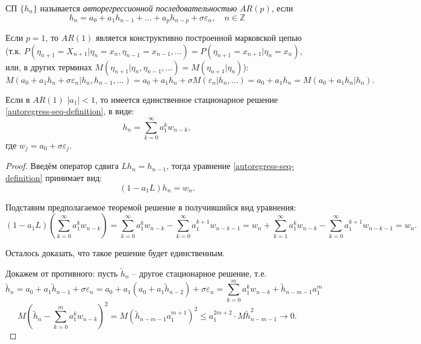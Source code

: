 \begin{definition}
  СП $\{h_n\}$ называется \emph{авторегрессионной последовательностью} $AR(p)$, если
  \begin{equation}\label{autoregress-seq-definition}
    h_n = a_0 + a_1 h_{n-1} + \dots + a_p h_{n-p} + \sigma \varepsilon_n, \quad n\in\mathbb{Z}
  \end{equation}
\end{definition}

\begin{remark}
  Если $p=1$, то $AR(1)$ является конструктивно построенной марковской цепью
  (т.к. $P(\eta_{n+1} = X_{n+1} | \eta_n = x_n, \eta_{n-1} = x_{n-1}, \dots) = P(\eta_{n+1} = x_{n+1} | \eta_n = x_n)$, или, в других терминах $M(\eta_{n+1} | \eta_n, \eta_{n-1}, \dots) = M(\eta_{n+1} | \eta_n)$):
  \[
    M(a_0 + a_1 h_n + \sigma \varepsilon_n | h_n, h_{n-1}, \dots) =
    a_0 + a_1 h_n + \sigma M(\varepsilon_n | h_n, \dots) = a_0 + a_1 h_n = M(a_0 + a_1 h_n | h_n).
  \]
\end{remark}

\begin{theorem}
  Если в $AR(1)$ $|a_1| < 1$, то имеется единственное стационарное решение
  \eqref{autoregress-seq-definition}, в виде:
  \[
    h_n = \sum_{k=0}^\infty a_1^k w_{n-k},
  \]
  где $w_j = a_0 + \sigma \varepsilon_j$.
\end{theorem}
\begin{proof}
  Введём оператор сдвига $L h_n = h_{n-1}$, тогда уравнение \eqref{autoregress-seq-definition}
  принимает вид:
  \[
    (1 - a_1 L) h_n = w_n.
  \]

  Подставим предполагаемое теоремой решение в получившийся вид уравнения:
  \[
    (1 - a_1 L) \left(\sum_{k=0}^\infty a_1^k w_{n-k}\right) = 
    \sum_{k=0}^\infty a_1^k w_{n-k} - \sum_{k=0}^\infty a_1^{k+1} w_{n-k-1} = 
    w_n + \sum_{k=1}^\infty a_1^k w_{n-k} - \sum_{k=0}^\infty a_1^{k+1} w_{n-k-1} =
    w_n.
  \]

  Осталось доказать, что такое решение будет единственным.

  Докажем от противного: пусть $\tilde{h}_n$ -- другое стационарное решение, т.е.
  \[
    \tilde{h}_n = a_0 + a_1 \tilde{h}_{n-1} + \sigma \varepsilon_n =
    a_0 + a_1 (a_0 + a_1 \tilde{h}_{n-2}) + \sigma \varepsilon_n = 
    \sum_{k=0}^m a_1^k w_{n-k} + \tilde{h}_{n-m-1} a_1^m
  \]
  \[
    M\left( \tilde{h}_n - \sum_{k=0}^m a_1^k w_{n-k} \right)^2 = M \left( \tilde{h}_{n-m-1} a_1^{m+1} \right)^2 \leqslant a_1^{2m + 2} \cdot M \tilde{h}_{n-m-1}^2 \to 0.
  \]
\end{proof}

